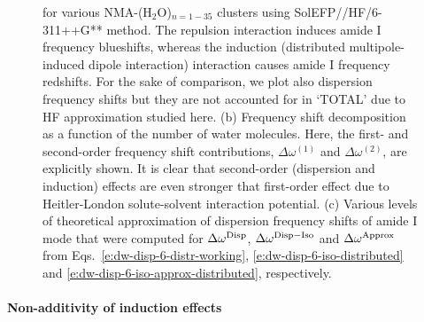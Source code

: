 \documentclass[a4paper,titlepage,twoside,fleqn,12pt]{book}
\begin{document}
\begin{refsection}
\begin{figure}[t!]
{for various NMA-(H$_2$O)$_{n = 1-35}$ clusters using 
SolEFP//HF/6-311++G** method. The repulsion interaction induces amide I
frequency blueshifts, whereas the induction (distributed multipole\hyp{}induced
dipole interaction) interaction causes amide I frequency redshifts.
For the sake of comparison, we plot also dispersion frequency shifts
but they are not accounted for in `TOTAL' due to HF approximation studied here.
(b) Frequency shift decomposition as a function of the number of water molecules.
Here, the first\hyp{} and second\hyp{}order frequency shift contributions,
$\Delta\omega^{(1)}$ and $\Delta\omega^{(2)}$, are explicitly shown. It is clear
that second\hyp{}order (dispersion and induction) effects are even stronger 
that first\hyp{}order effect due to Heitler\hyp{}London solute\hyp{}solvent
interaction potential.
(c) Various levels of theoretical approximation of dispersion frequency
shifts of amide I mode that were computed for $\Delta\omega^{\rm Disp}$,
$\Delta\omega^{\rm Disp-Iso}$ and $\Delta\omega^{\rm Approx}$ 
from Eqs.~\eqref{e:dw-disp-6-distr-working}, \eqref{e:dw-disp-6-iso-distributed} 
and \eqref{e:dw-disp-6-iso-approx-distributed}, respectively.
\label{f:nma-water-rhf}}
\end{figure}
%

\paragraph{Non\hyp{}additivity of induction effects}


\end{refsection}
\end{document}
